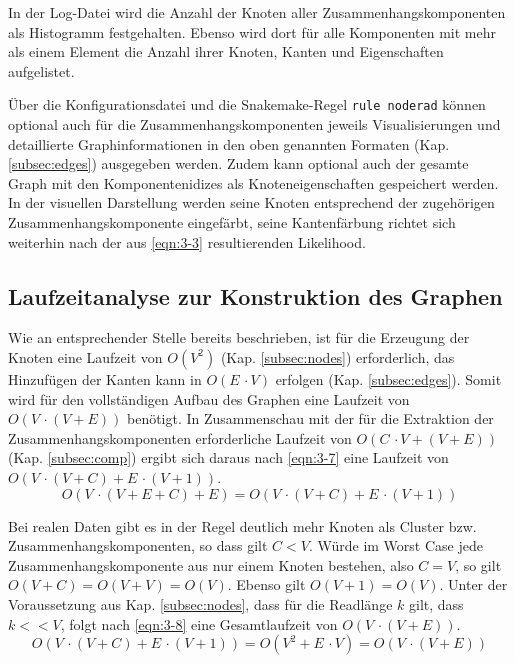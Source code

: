 In der Log-Datei wird die Anzahl der Knoten aller Zusammenhangskomponenten als Histogramm festgehalten. Ebenso wird dort für alle Komponenten mit mehr als einem Element die Anzahl ihrer Knoten, Kanten und Eigenschaften aufgelistet.

Über die Konfigurationsdatei und die Snakemake-Regel \lstinline|rule noderad| können optional auch für die Zusammenhangskomponenten jeweils Visualisierungen und detaillierte Graphinformationen in den oben genannten Formaten (Kap. \ref{subsec:edges}) ausgegeben werden. Zudem kann optional auch der gesamte Graph mit den Komponentenidizes als Knoteneigenschaften gespeichert werden. In der visuellen Darstellung werden seine Knoten entsprechend der zugehörigen Zusammenhangskomponente eingefärbt, seine Kantenfärbung richtet sich weiterhin nach der aus \eqref{eqn:3-3} resultierenden Likelihood.

\subsection{Laufzeitanalyse zur Konstruktion des Graphen}
Wie an entsprechender Stelle bereits beschrieben, ist für die Erzeugung der Knoten eine Laufzeit von $ O(V^2) $ (Kap. \ref{subsec:nodes}) erforderlich, das Hinzufügen der Kanten kann in $ O(E\, \cdotp V) $ erfolgen (Kap. \ref{subsec:edges}). Somit wird für den vollständigen Aufbau des Graphen eine Laufzeit von $ O(V \, \cdotp (V+E)) $ benötigt. In Zusammenschau mit der für die Extraktion der Zusammenhangskomponenten erforderliche Laufzeit von $ O(C \, \cdotp V + (V + E)) $ (Kap. \ref{subsec:comp}) ergibt sich daraus nach  \eqref{eqn:3-7} eine Laufzeit von $ O(V \, \cdotp (V + C) + E \, \cdotp (V + 1)) $. 
\begin{equation} \label{eqn:3-7}
\tag{3-7}
O(V \, \cdotp (V + E + C) + E) = O(V \, \cdotp (V + C) + E \, \cdotp (V + 1))
\end{equation}

Bei realen Daten gibt es in der Regel deutlich mehr Knoten als Cluster bzw. Zusammenhangskomponenten, so dass gilt $ C < V $. Würde im Worst Case jede Zusammenhangskomponente aus nur einem Knoten bestehen, also $ C = V $, so gilt $ O(V + C) = O(V + V) = O(V) $. Ebenso gilt $ O(V + 1) = O(V) $. Unter der Voraussetzung aus Kap. \ref{subsec:nodes}, dass für die Readlänge $ k $ gilt, dass $ k << V $, folgt nach  \eqref{eqn:3-8} eine Gesamtlaufzeit von $ O(V \, \cdotp (V + E)) $.
\begin{equation} \label{eqn:3-8}
\tag{3-8}
O(V \, \cdotp (V + C) + E \, \cdotp (V + 1)) = O (V^2 + E \, \cdotp V) = O(V \, \cdotp (V + E))
\end{equation}

